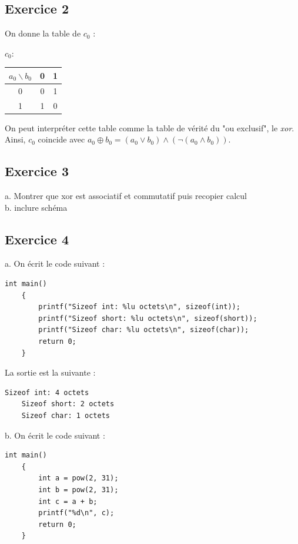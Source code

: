 \documentclass[a4 paper, 12pt]{article}
\begin{document}
\subsection{Exercice 2}
On donne la table de $c_0$ :
\begin{center}
    $c_0 \colon$
    \begin{tabular}{||c | c | c ||} 
     \hline
     $a_0 \backslash b_0$ & 0 & 1 \\ [0.5ex] 
     \hline\hline
     0 & 0 & 1  \\ 
     \hline
     1 & 1 & 0 \\
     \hline
    \end{tabular}
\end{center}
On peut interpréter cette table comme la table de vérité du "ou exclusif", le \textit{xor}. Ainsi, $c_0$ coincide avec $a_0 \oplus b_0 = (a_0 \vee b_0) \wedge (\neg (a_0 \wedge b_0))$.

\subsection{Exercice 3}
a. Montrer que xor est associatif et commutatif puis recopier calcul\\

b. inclure schéma

\subsection{Exercice 4}
a. On écrit le code suivant :\\
\begin{lstlisting}[style=CStyle]
int main()
    {
        printf("Sizeof int: %lu octets\n", sizeof(int));
        printf("Sizeof short: %lu octets\n", sizeof(short));
        printf("Sizeof char: %lu octets\n", sizeof(char));
        return 0;
    }
\end{lstlisting}

La sortie est la suivante :\\
\begin{lstlisting}[frame = single]
    Sizeof int: 4 octets
    Sizeof short: 2 octets
    Sizeof char: 1 octets
\end{lstlisting}

b. On écrit le code suivant :
\begin{lstlisting}[style=CStyle]
int main()
    {
        int a = pow(2, 31);
        int b = pow(2, 31);
        int c = a + b;
        printf("%d\n", c);
        return 0;
    }
\end{lstlisting}
\end{document}
